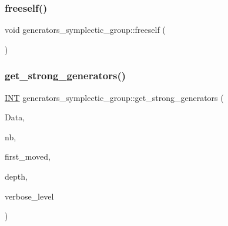 \mbox{\label{classgenerators__symplectic__group_ac65e97312a9d38be33fdf80f33b687c9}} 
\subsubsection{\texorpdfstring{freeself()}{freeself()}}
{\footnotesize\ttfamily void generators\+\_\+symplectic\+\_\+group\+::freeself (\begin{DoxyParamCaption}{ }\end{DoxyParamCaption})}

\mbox{\label{classgenerators__symplectic__group_a106102382bb375ece59b5b1d85f063da}} 
\subsubsection{\texorpdfstring{get\+\_\+strong\+\_\+generators()}{get\_strong\_generators()}}
{\footnotesize\ttfamily \mbox{\hyperlink{galois_8h_a09fddde158a3a20bd2dcadb609de11dc}{I\+NT}} generators\+\_\+symplectic\+\_\+group\+::get\+\_\+strong\+\_\+generators (\begin{DoxyParamCaption}\item[{\mbox{\hyperlink{galois_8h_a09fddde158a3a20bd2dcadb609de11dc}{I\+NT}} $\ast$}]{Data,  }\item[{\mbox{\hyperlink{galois_8h_a09fddde158a3a20bd2dcadb609de11dc}{I\+NT}} \&}]{nb,  }\item[{\mbox{\hyperlink{galois_8h_a09fddde158a3a20bd2dcadb609de11dc}{I\+NT}} \&}]{first\+\_\+moved,  }\item[{\mbox{\hyperlink{galois_8h_a09fddde158a3a20bd2dcadb609de11dc}{I\+NT}}}]{depth,  }\item[{\mbox{\hyperlink{galois_8h_a09fddde158a3a20bd2dcadb609de11dc}{I\+NT}}}]{verbose\+\_\+level }\end{DoxyParamCaption})}

\mbox{\label{classgenerators__symplectic__group_a3f0418f9f639b4a2ab1ce3b6ea89233d}} 
